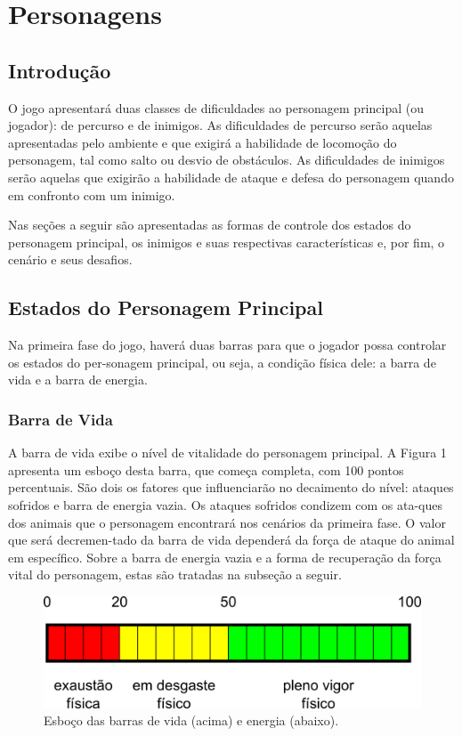 ﻿\section{Personagens}

\subsection{Introdução}
O jogo apresentará duas classes de dificuldades ao personagem principal 
(ou jogador): de percurso e de inimigos. As dificuldades de percurso serão 
aquelas apresentadas pelo ambiente e que exigirá a habilidade de locomoção 
do personagem, tal como salto ou desvio de obstáculos. As dificuldades 
de inimigos serão aquelas que exigirão a habilidade de ataque e defesa 
do personagem quando em confronto com um inimigo.

Nas seções a seguir são apresentadas as formas de controle dos estados 
do personagem principal, os inimigos e suas respectivas características 
e, por fim, o cenário e seus desafios.

\subsection{Estados do Personagem Principal}
Na primeira fase do jogo, haverá duas barras para que o jogador possa 
controlar os estados do per-sonagem principal, ou seja, a condição física 
dele: a barra de vida e a barra de energia.
 
\subsubsection{Barra de Vida}
A barra de vida exibe o nível de vitalidade do personagem principal. 
A Figura 1 apresenta um esboço desta barra, que começa completa, com
100 pontos percentuais. São dois os fatores que influenciarão no 
decaimento do nível: ataques sofridos e barra de energia vazia. Os ataques 
sofridos condizem com os ata-ques dos animais que o personagem encontrará
nos cenários da primeira fase. O valor que será decremen-tado da barra de 
vida dependerá da força de ataque do animal em específico. Sobre a barra de 
energia vazia e a forma de recuperação da força vital do personagem, estas
são tratadas na subseção a seguir.

\begin{figure}[!ht]
 \centering
 \includegraphics[scale=0.6]{BarraDeEnergia.png}
 \caption{Esboço das barras de vida (acima) e energia (abaixo).}
 \label{img:reason}
\end{figure}

